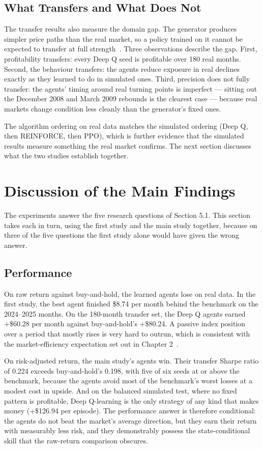 \subsection{What Transfers and What Does Not}

The transfer results also measure the domain gap. The generator produces
simpler price paths than the real market, so a policy trained on it
cannot be expected to transfer at full strength~\cite{silver2016}. Three
observations describe the gap. First, profitability transfers: every
Deep Q seed is profitable over 180 real months. Second, the behaviour
transfers: the agents reduce exposure in real declines exactly as they
learned to do in simulated ones. Third, precision does not fully
transfer: the agents' timing around real turning points is imperfect ---
sitting out the December 2008 and March 2009 rebounds is the clearest
case --- because real markets change condition less cleanly than the
generator's fixed ones.

The algorithm ordering on real data matches the simulated ordering
(Deep Q, then REINFORCE, then PPO), which is further evidence that the
simulated results measure something the real market confirms. The next
section discusses what the two studies establish together.

\section{Discussion of the Main Findings}

The experiments answer the five research questions of Section 5.1. This
section takes each in turn, using the first study and the main study together,
because on three of the five questions the first study alone would have given
the wrong answer.

\subsection{Performance}

On raw return against buy-and-hold, the learned agents lose on real
data. In the first study, the best agent finished \$8.74 per month behind the
benchmark on the 2024--2025 months. On the 180-month transfer set, the
Deep Q agents earned +\$60.28 per month against buy-and-hold's +\$80.24.
A passive index position over a period that mostly rises is very hard to
outrun, which is consistent with the market-efficiency expectation set
out in Chapter 2~\cite{fama1970}.

On risk-adjusted return, the main study's agents win. Their transfer
Sharpe ratio of 0.224 exceeds buy-and-hold's 0.198, with five of six
seeds at or above the benchmark, because the agents avoid most of the
benchmark's worst losses at a modest cost in upside. And on the balanced
simulated test, where no fixed pattern is profitable, Deep Q-learning is
the only strategy of any kind that makes money (+\$126.94 per episode).
The performance answer is therefore conditional: the agents do not beat
the market's average direction, but they earn their return with
measurably less risk, and they demonstrably possess the
state-conditional skill that the raw-return comparison obscures.

